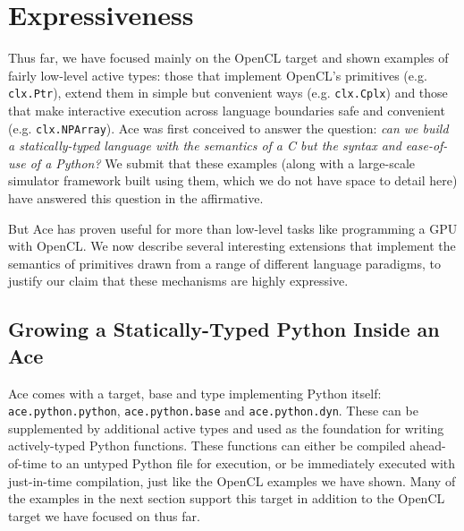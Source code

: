 \documentclass[9pt,preprint]{sigplanconf}
\begin{document}
\section{Expressiveness}\label{examples}
Thus far, we have focused mainly on the OpenCL target and shown examples of fairly low-level active types: those that implement OpenCL's primitives (e.g. \verb|clx.Ptr|), extend them in simple but convenient ways (e.g. \verb|clx.Cplx|) and those that make interactive execution across language boundaries safe and convenient (e.g. \verb|clx.NPArray|). 
Ace was first conceived to answer the question: \emph{can we build a statically-typed language with the semantics of a C but the syntax and ease-of-use of a Python?} We submit that these examples (along with a large-scale simulator framework built using them, which we do not have space to detail here) have answered this question in the affirmative. 

But Ace has proven useful for more than low-level tasks like programming a GPU with OpenCL. We now describe several interesting extensions that implement the semantics of primitives drawn from a range of different language paradigms, to justify our claim that these mechanisms are highly expressive. 

\subsection{Growing a Statically-Typed Python Inside an Ace}
Ace comes with a target, base and type implementing Python itself: \verb|ace.python.python|, \verb|ace.python.base| and \verb|ace.python.dyn|. These can be supplemented by additional active types and used as the foundation for writing actively-typed Python functions. These functions can either be compiled ahead-of-time to an untyped Python file for execution, or be immediately executed with just-in-time compilation, just like the OpenCL examples we have shown. Many of the examples in the next section support this target in addition to the OpenCL target we have focused on thus far.
\end{document}
